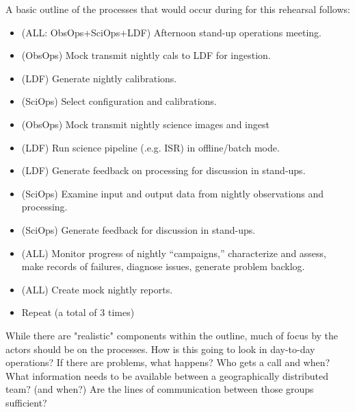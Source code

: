 A basic outline of the processes that would occur during for this rehearsal 
follows:
\begin{itemize}[topsep=-8pt]
\item (ALL: ObsOps+SciOps+LDF) Afternoon stand-up operations meeting.
\item (ObsOps) Mock transmit nightly cals to LDF for ingestion.
\item (LDF) Generate nightly calibrations.
\item (SciOps) Select configuration and calibrations.
\item (ObsOps) Mock transmit nightly science images and ingest
\item (LDF) Run science pipeline (.e.g. ISR) in offline/batch mode.
\item (LDF) Generate feedback on processing for discussion in stand-ups.
\item (SciOps) Examine input and output data from nightly observations and
processing.
\item (SciOps) Generate feedback for discussion in stand-ups.
\item (ALL) Monitor progress of nightly “campaigns,” characterize and assess, 
make records of failures, diagnose issues, generate problem backlog.
\item (ALL) Create mock nightly reports.
\item Repeat (a total of 3 times)
\end{itemize}

While there are "realistic" components within the outline, much of focus by 
the actors should be on the processes.  How is this going to look in 
day-to-day operations?  If there are problems, what happens?  Who gets a 
call and when?  What information needs to be available between a geographically
distributed team? (and when?)  Are the lines of communication between those
groups sufficient?


%
%

